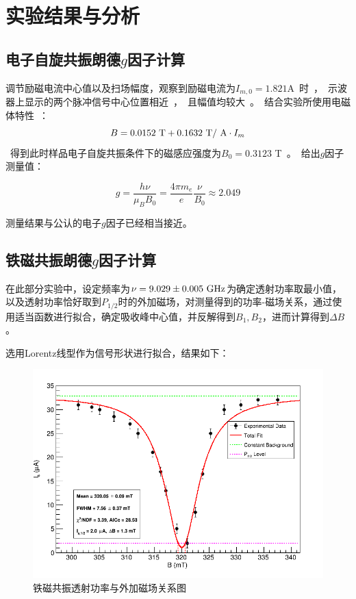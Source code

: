 \documentclass{thuemp}
\begin{document}
    \section{实验结果与分析}
    
    \subsection{电子自旋共振朗德$g$因子计算}
    
    调节励磁电流中心值以及扫场幅度，观察到励磁电流为$I_{m,0} = 1.821$\si\ampere 时，示波器上显示的两个脉冲信号中心位置相近，且幅值均较大。结合实验所使用电磁体特性：
    
    \begin{equation}
        B = 0.0152 ~\text{\si\tesla} + 0.1632 ~\text{\si\tesla / \si\ampere} \cdot I_m
    \end{equation}
    
    得到此时样品电子自旋共振条件下的磁感应强度为$B_0 = 0.3123$ \si\tesla。给出$g$因子测量值：
    
    \begin{equation}
    g = \frac{h \nu}{\mu_B B_0} = \frac{4\pi m_e}{e} \frac{\nu}{B_0}\approx 2.049
    \end{equation}
    
    测量结果与公认的电子$g$因子已经相当接近。
    
    \subsection{铁磁共振朗德$g$因子计算}
    
    在此部分实验中，设定频率为$\nu = 9.029 \pm 0.005~\text{\si{\giga \hertz}}$为确定透射功率取最小值，以及透射功率恰好取到$P_{1/2}$时的外加磁场，对测量得到的功率-磁场关系，通过使用适当函数进行拟合，确定吸收峰中心值，并反解得到$B_1, B_2$，进而计算得到$\Delta B$。
    
    选用Lorentz线型作为信号形状进行拟合，结果如下：
    
    \begin{figure}[H]
        \centering
        \includegraphics[width=0.9\linewidth]{../Data/FMR_ConstantBg_LorentzPeak.png}
        \caption{铁磁共振透射功率与外加磁场关系图} \label{fig:gmr_gradient}
    \end{figure}
    
\end{document}

